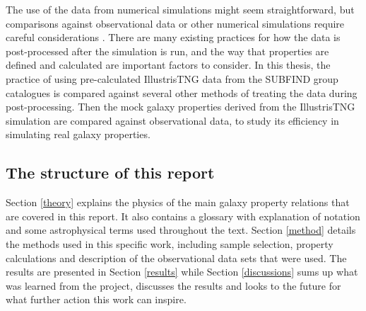 The use of the data from numerical simulations might seem straightforward, but comparisons against observational data or other numerical simulations require careful considerations \parencite[see e.g.,][]{Sande2018, Schaye2015, Pillepich2017}. There are many existing practices for how the data is post-processed after the simulation is run, and the way that properties are defined and calculated are important factors to consider. In this thesis, the practice of using pre-calculated IllustrisTNG data from the SUBFIND group catalogues is compared against several other methods of treating the data during post-processing. Then the mock galaxy properties derived from the IllustrisTNG simulation are compared against observational data, to study its efficiency in simulating real galaxy properties.

\subsection{The structure of this report}
Section \ref{theory} explains the physics of the main galaxy property relations that are covered in this report. It also contains a glossary with explanation of notation and some astrophysical terms used throughout the text. Section \ref{method} details the methods used in this specific work, including sample selection, property calculations and description of the observational data sets that were used. The results are presented in Section \ref{results} while Section \ref{discussions} sums up what was learned from the project, discusses the results and looks to the future for what further action this work can inspire.
